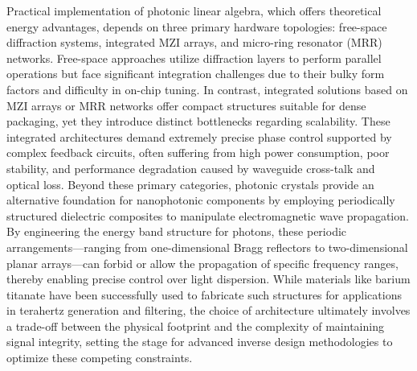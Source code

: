 Practical implementation of photonic linear algebra, which offers theoretical energy advantages, depends on three primary hardware topologies: free-space diffraction systems, integrated MZI arrays, and micro-ring resonator (MRR) networks. Free-space approaches utilize diffraction layers to perform parallel operations but face significant integration challenges due to their bulky form factors and difficulty in on-chip tuning. In contrast, integrated solutions based on MZI arrays or MRR networks offer compact structures suitable for dense packaging, yet they introduce distinct bottlenecks regarding scalability. These integrated architectures demand extremely precise phase control supported by complex feedback circuits, often suffering from high power consumption, poor stability, and performance degradation caused by waveguide cross-talk and optical loss. Beyond these primary categories, photonic crystals provide an alternative foundation for nanophotonic components by employing periodically structured dielectric composites to manipulate electromagnetic wave propagation. \citep{doi_10_71465_gmssrj79_3a431fc8} \citep{doi_10_3390_axioms14060445_76ffad4a} By engineering the energy band structure for photons, these periodic arrangements---ranging from one-dimensional Bragg reflectors to two-dimensional planar arrays---can forbid or allow the propagation of specific frequency ranges, thereby enabling precise control over light dispersion. \citep{doi_10_4302_plp_v17i4_1361_327bd6c2} \citep{doi_10_1149_ma2026_01231276mtgabs_21448056} While materials like barium titanate have been successfully used to fabricate such structures for applications in terahertz generation and filtering, the choice of architecture ultimately involves a trade-off between the physical footprint and the complexity of maintaining signal integrity, setting the stage for advanced inverse design methodologies to optimize these competing constraints. \citep{doi_10_1088_1402_4896_ae8345_3b948559} \citep{doi_10_1002_adom_202001249_3b8c9743}

